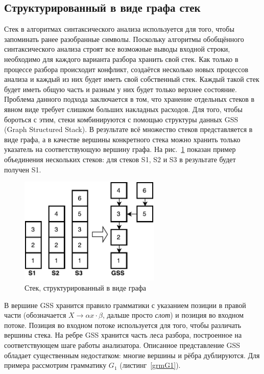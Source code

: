\subsection{Структурированный в виде графа стек}
Стек в алгоритмах синтаксического анализа используется для того, чтобы запоминать ранее разобранные символы. Поскольку алгоритмы обобщённого синтаксического анализа строят все возможные выводы входной строки, необходимо для каждого варианта разбора хранить свой стек. Как только в процессе разбора происходит конфликт, создаётся несколько новых процессов анализа и каждый из них будет иметь свой собственный стек. Каждый такой стек будет иметь общую часть и разным у них будет только верхнее состояние. Проблема данного подхода заключается в том, что хранение отдельных стеков в явном виде требует слишком больших накладных расходов. Для того, чтобы бороться с этим, стеки комбинируются с помощью структуры данных GSS (Graph Structured Stack). В результате всё множество стеков представляется в виде графа, а в качестве вершины конкретного стека можно хранить только указатель на соответствующую вершину графа. На рис.~\ref{GSS} показан пример объединения нескольких стеков: для стеков S1, S2 и S3 в результате будет получен S1.

\begin{figure}
 \centering
 \includegraphics[width=0.6\textwidth]{Ragozina/pics/GSS.pdf}
 \caption{Стек, структурированный в виде графа  }
 \label{GSS}
\end{figure}

В вершине GSS хранится правило грамматики с указанием позиции в правой части (обозначается $X \rightarrow \alpha x \cdot \beta$, дальше просто \textit{слот}) и позиция во входном потоке. Позиция во входном потоке используется для того, чтобы различать вершины стека. На ребре GSS хранится часть леса разбора, построенное на соответствующем шаге работы анализатора. Описанное представление GSS обладает существенным недостатком: многие вершины и рёбра дублируются. Для примера рассмотрим грамматику $G_1$ (листинг~\ref{grmG1}).

